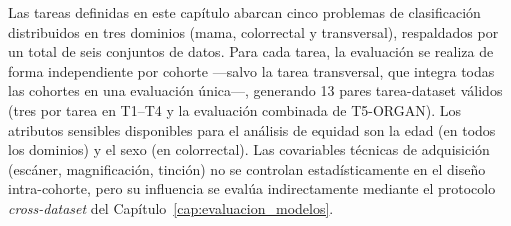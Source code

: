 Las tareas definidas en este capítulo abarcan cinco problemas de clasificación distribuidos en tres dominios (mama, colorrectal y transversal), respaldados por un total de seis conjuntos de datos. Para cada tarea, la evaluación se realiza de forma independiente por cohorte —salvo la tarea transversal, que integra todas las cohortes en una evaluación única—, generando 13 pares tarea-dataset válidos (tres por tarea en T1--T4 y la evaluación combinada de T5-ORGAN). Los atributos sensibles disponibles para el análisis de equidad son la edad (en todos los dominios) y el sexo (en colorrectal). Las covariables técnicas de adquisición (escáner, magnificación, tinción) no se controlan estadísticamente en el diseño intra-cohorte, pero su influencia se evalúa indirectamente mediante el protocolo \textit{cross-dataset} del Capítulo~\ref{cap:evaluacion_modelos}.
